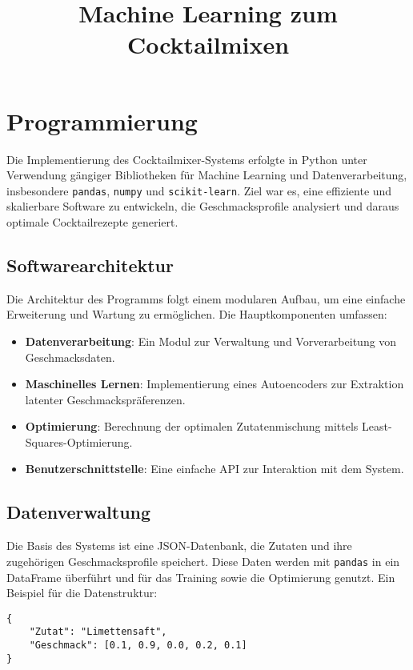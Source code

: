 \documentclass[a4paper,12pt]{article}
\begin{document}
\title{Machine Learning zum Cocktailmixen}
\maketitle

\section{Programmierung}

Die Implementierung des Cocktailmixer-Systems erfolgte in Python unter Verwendung gängiger Bibliotheken für Machine Learning und Datenverarbeitung, insbesondere \texttt{pandas}, \texttt{numpy} und \texttt{scikit-learn}. Ziel war es, eine effiziente und skalierbare Software zu entwickeln, die Geschmacksprofile analysiert und daraus optimale Cocktailrezepte generiert.

\subsection{Softwarearchitektur}
Die Architektur des Programms folgt einem modularen Aufbau, um eine einfache Erweiterung und Wartung zu ermöglichen. Die Hauptkomponenten umfassen:
\begin{itemize}
    \item \textbf{Datenverarbeitung}: Ein Modul zur Verwaltung und Vorverarbeitung von Geschmacksdaten.
    \item \textbf{Maschinelles Lernen}: Implementierung eines Autoencoders zur Extraktion latenter Geschmackspräferenzen.
    \item \textbf{Optimierung}: Berechnung der optimalen Zutatenmischung mittels Least-Squares-Optimierung.
    \item \textbf{Benutzerschnittstelle}: Eine einfache API zur Interaktion mit dem System.
\end{itemize}

\subsection{Datenverwaltung}
Die Basis des Systems ist eine JSON-Datenbank, die Zutaten und ihre zugehörigen Geschmacksprofile speichert. Diese Daten werden mit \texttt{pandas} in ein DataFrame überführt und für das Training sowie die Optimierung genutzt. Ein Beispiel für die Datenstruktur:

\begin{verbatim}
{
    "Zutat": "Limettensaft",
    "Geschmack": [0.1, 0.9, 0.0, 0.2, 0.1]
}
\end{verbatim}
\end{document}
